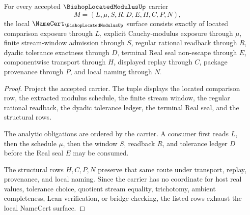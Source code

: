 \begin{theorem}
\label{thm:bishop-located-modulus-namecert-obligations}
For every accepted $\BishopLocatedModulusUp$ carrier
$$
M=(L,\mu,S,R,D,E,H,C,P,N),
$$
the local $\NameCert_{\BishopLocatedModulusUp}$ surface consists exactly of located comparison exposure through $L$, explicit Cauchy-modulus exposure through $\mu$, finite stream-window admission through $S$, regular rational readback through $R$, dyadic tolerance exactness through $D$, terminal Real seal non-escape through $E$, componentwise transport through $H$, displayed replay through $C$, package provenance through $P$, and local naming through $N$.
\end{theorem}
\begin{proof}
Project the accepted carrier. The tuple displays the located comparison row, the extracted modulus schedule, the finite stream window, the regular rational readback, the dyadic tolerance ledger, the terminal Real seal, and the structural rows.

The analytic obligations are ordered by the carrier. A consumer first reads $L$, then the schedule $\mu$, then the window $S$, readback $R$, and tolerance ledger $D$ before the Real seal $E$ may be consumed.

The structural rows $H,C,P,N$ preserve that same route under transport, replay, provenance, and local naming. Since the carrier has no coordinate for host real values, tolerance choice, quotient stream equality, trichotomy, ambient completeness, Lean verification, or bridge checking, the listed rows exhaust the local NameCert surface.
\end{proof}

